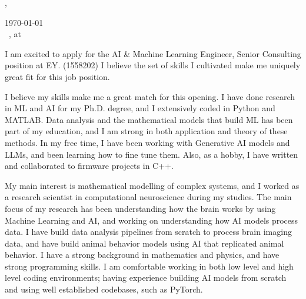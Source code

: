 \documentclass[12pt]{letter}
\begin{document}
\AddToShipoutPictureBG{%
  \color{gr}
  \AtPageUpperLeft{\rule[-1.3in]{\paperwidth}{1.3in}}
}

\begin{center}
  {\fontsize{28}{0}\selectfont\scshape \myname, \mytitle} \\
  \vspace{0.1in}
  \href{mailto:\myemail}{\faEnvelope\enspace \myemail}\hfill
  \href{https://linkedin.com/in/\mylinkedin}{\faLinkedinIn\enspace\mylinkedin}\hfill
  \href{tel:\myphone}{\faPhone\enspace \myphone}\hfill
  \faMapMarker\enspace \mylocation
\end{center}

\vspace{0.2in}

\today\vspace{0.1in}\\

\vspace{-0.1in}\greeting\ \recipient, at \company \\

\vspace{-0.1in}\setlength\parindent{24pt}
\noindent

I am excited to apply for the AI \& Machine Learning Engineer, Senior
Consulting position at EY. (1558202)
I believe the set of skills I cultivated make me uniquely great fit
for this job position.

I believe my skills make me a great match for this opening.
I have done research in ML and AI for my Ph.D. degree, and I
extensively coded in Python and MATLAB.
Data analysis and the mathematical models that build ML has been part
of my education, and I am strong in both application and theory of
these methods.
In my free time, I have been working with Generative AI models and
LLMs, and been learning how to fine tune them.
Also, as a hobby, I have written and collaborated to firmware projects in C++.

My main interest is mathematical modelling of complex systems,
and I worked as a research scientist in computational neuroscience
during my studies.
The main focus of my research has been understanding how the brain
works by using Machine Learning and AI,
and working on understanding how AI models process data.
I have build data analysis pipelines from scratch to process brain imaging data,
and have build animal behavior models using AI that replicated animal behavior.
I have a strong background in mathematics and physics, and have
strong programming skills.
I am comfortable working in both low level and high level coding environments;
having experience building AI models from scratch and using well
established codebases, such as PyTorch.
\end{document}
